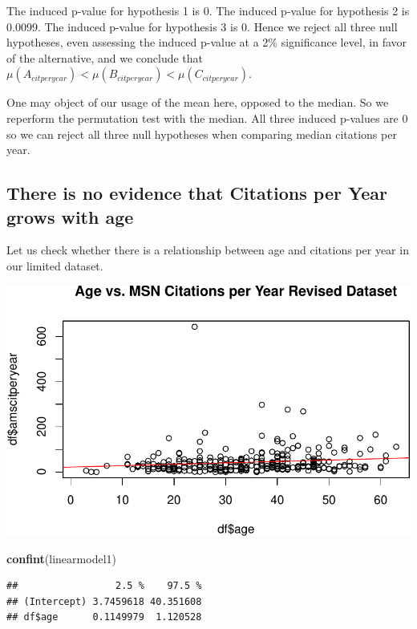 \documentclass[]{article}
\newenvironment{Shaded}{\begin{snugshade}}{\end{snugshade}}
\newcommand{\KeywordTok}[1]{\textcolor[rgb]{0.13,0.29,0.53}{\textbf{#1}}}
\newcommand{\NormalTok}[1]{#1}
\begin{document}
The induced p-value for hypothesis 1 is 0. The induced p-value for
hypothesis 2 is 0.0099. The induced p-value for hypothesis 3 is 0. Hence
we reject all three null hypotheses, even assessing the induced p-value
at a 2\% significance level, in favor of the alternative, and we
conclude that
\(\mu(A_{citperyear}) < \mu(B_{citperyear}) < \mu(C_{citperyear})\).

One may object of our usage of the mean here, opposed to the median. So
we reperform the permutation test with the median. All three induced
p-values are 0 so we can reject all three null hypotheses when comparing
median citations per year.

\hypertarget{there-is-no-evidence-that-citations-per-year-grows-with-age}{%
\subsection{There is no evidence that Citations per Year grows with
age}\label{there-is-no-evidence-that-citations-per-year-grows-with-age}}

Let us check whether there is a relationship between age and citations
per year in our limited dataset.

\includegraphics{Response_files/figure-latex/unnamed-chunk-22-1.pdf}

\begin{Shaded}
\begin{Highlighting}[]
\KeywordTok{confint}\NormalTok{(linearmodel1)}
\end{Highlighting}
\end{Shaded}

\begin{verbatim}
##                 2.5 %    97.5 %
## (Intercept) 3.7459618 40.351608
## df$age      0.1149979  1.120528
\end{verbatim}
\end{document}
